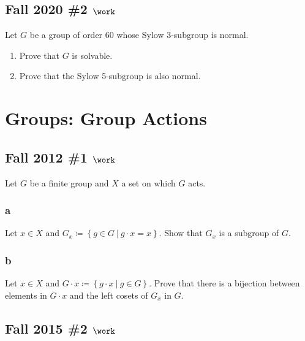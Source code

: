 \hypertarget{fall-2020-2-work}{%
\subsection{\texorpdfstring{Fall 2020 \#2
\(\work\)}{Fall 2020 \#2 \textbackslash work}}\label{fall-2020-2-work}}

Let \(G\) be a group of order 60 whose Sylow 3-subgroup is normal.

\begin{enumerate}
\def\labelenumi{\alph{enumi}.}
\item
  Prove that \(G\) is solvable.
\item
  Prove that the Sylow 5-subgroup is also normal.
\end{enumerate}

\hypertarget{groups-group-actions}{%
\section{Groups: Group Actions}\label{groups-group-actions}}

\hypertarget{fall-2012-1-work}{%
\subsection{\texorpdfstring{Fall 2012 \#1
\(\work\)}{Fall 2012 \#1 \textbackslash work}}\label{fall-2012-1-work}}

Let \(G\) be a finite group and \(X\) a set on which \(G\) acts.

\hypertarget{a-14}{%
\subsubsection{a}\label{a-14}}

Let \(x\in X\) and
\(G_x \coloneqq\left\{{g\in G {~\mathrel{\Big|}~}g\cdot x = x}\right\}\).
Show that \(G_x\) is a subgroup of \(G\).

\hypertarget{b-14}{%
\subsubsection{b}\label{b-14}}

Let \(x\in X\) and
\(G\cdot x \coloneqq\left\{{g\cdot x {~\mathrel{\Big|}~}g\in G}\right\}\).
Prove that there is a bijection between elements in \(G\cdot x\) and the
left cosets of \(G_x\) in \(G\).

\hypertarget{fall-2015-2-work}{%
\subsection{\texorpdfstring{Fall 2015 \#2
\(\work\)}{Fall 2015 \#2 \textbackslash work}}\label{fall-2015-2-work}}

